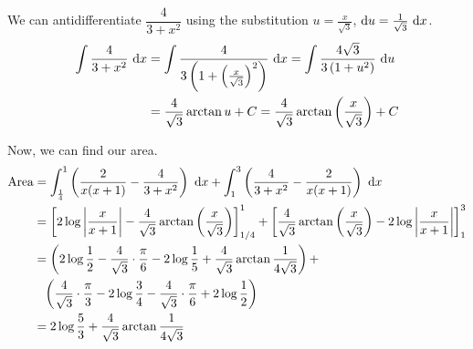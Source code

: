 \begin{solution}
We can antidifferentiate $\dfrac{4}{3+x^2}$ using the substitution $u=\frac{x}{\sqrt3}$, $\mathrm{d}u=\frac{1}{\sqrt3}~\mathrm{d}x$.
\begin{align*}
\int\frac{4}{3+x^2}~\mathrm{d}x&=
\int\frac{4}{3\left(1+\left(\frac{x}{\sqrt3}\right)^2\right)}~\mathrm{d}x=
\int\frac{4\sqrt3}{3\left(1+u^2\right)}~\mathrm{d}u\\
&=\frac{4}{\sqrt3}\arctan u +C=\frac{4}{\sqrt3}\arctan \left(\frac{x}{\sqrt3}\right) +C
\end{align*}

Now, we can find our area.
\begin{align*}
\mbox{Area}&=\int_{\frac14}^1 \left( \frac{2}{x(x+1)} - \frac{4}{3+x^2}\right)~\mathrm{d}x+
\int_{1}^3 \left( \frac{4}{3+x^2} -\frac{2}{x(x+1)}  \right)~\mathrm{d}x\\
&=\left[2\log\left|\frac{x}{x+1}\right| - \frac{4}{\sqrt3}\arctan\left(\frac{x}{\sqrt3}\right)\right] _{1/4}^1+
\left[ \frac{4}{\sqrt3}\arctan\left(\frac{x}{\sqrt3}\right)-2\log\left|\frac{x}{x+1}\right|\right]_1^3\\
&=\left(2\log\frac{1}{2}- \frac{4}{\sqrt3}\cdot\frac{\pi}{6} - 2\log\frac{1}{5}+\frac{4}{\sqrt3}\arctan\frac{1}{4\sqrt3}\right)+\\
&\hphantom{=} \left(\frac{4}{\sqrt3}\cdot\frac{\pi}{3} - 2\log\frac34 - \frac{4}{\sqrt3}\cdot \frac{\pi}{6}+2\log\frac{1}{2}\right)\\
&=2\log\frac53+\frac{4}{\sqrt3}\arctan\frac{1}{4\sqrt3}
\end{align*}
\end{solution}


